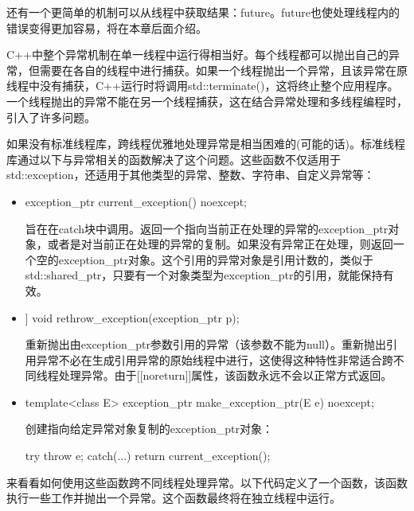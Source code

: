 还有一个更简单的机制可以从线程中获取结果：future。future也使处理线程内的错误变得更加容易，将在本章后面介绍。


C++中整个异常机制在单一线程中运行得相当好。每个线程都可以抛出自己的异常，但需要在各自的线程中进行捕获。如果一个线程抛出一个异常，且该异常在原线程中没有捕获，C++运行时将调用std::terminate()，这将终止整个应用程序。一个线程抛出的异常不能在另一个线程捕获，这在结合异常处理和多线程编程时，引入了许多问题。

如果没有标准线程库，跨线程优雅地处理异常是相当困难的(可能的话)。标准线程库通过以下与异常相关的函数解决了这个问题。这些函数不仅适用于std::exception，还适用于其他类型的异常、整数、字符串、自定义异常等：

\begin{itemize}
\item
\begin{cpp}
exception_ptr current_exception() noexcept;
\end{cpp}

旨在在catch块中调用。返回一个指向当前正在处理的异常的exception\_ptr对象，或者是对当前正在处理的异常的复制。如果没有异常正在处理，则返回一个空的exception\_ptr对象。这个引用的异常对象是引用计数的，类似于std::shared\_ptr，只要有一个对象类型为exception\_ptr的引用，就能保持有效。

\item
\begin{cpp}
[[noreturn]] void rethrow_exception(exception_ptr p);
\end{cpp}

重新抛出由exception\_ptr参数引用的异常（该参数不能为null）。重新抛出引用异常不必在生成引用异常的原始线程中进行，这使得这种特性非常适合跨不同线程处理异常。由于[[noreturn]]属性，该函数永远不会以正常方式返回。

\item
\begin{cpp}
template<class E> exception_ptr make_exception_ptr(E e) noexcept;
\end{cpp}

创建指向给定异常对象复制的exception\_ptr对象：

\begin{cpp}
try { throw e; }
catch(...) { return current_exception(); }
\end{cpp}
\end{itemize}

来看看如何使用这些函数跨不同线程处理异常。以下代码定义了一个函数，该函数执行一些工作并抛出一个异常。这个函数最终将在独立线程中运行。

